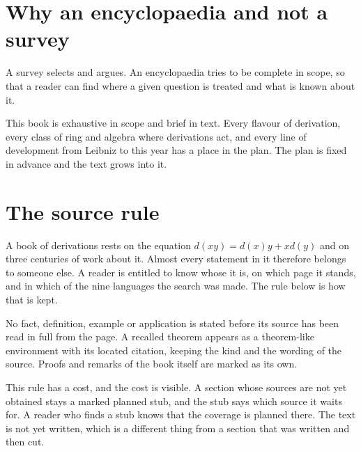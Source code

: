 \section*{Why an encyclopaedia and not a survey}

A survey selects and argues. An encyclopaedia tries to be complete in scope, so that a %
reader can find where a given question is treated and what is known about it.

This book is exhaustive in scope and brief in text. %
Every flavour of derivation, every class of ring and algebra where derivations %
act, and every line of development from Leibniz to this year has a place in the
plan.
The plan is fixed in advance and the text grows into it. %

\section*{The source rule}

A book of derivations rests on the equation $d(xy)=d(x)y+xd(y)$ and on three %
centuries of work about it. Almost every statement in it therefore belongs to someone else. %
A reader is entitled to know whose it is, on which page it stands, and in which
of the nine languages the search was made. The rule below is how that is kept. %

No fact, definition, example or application is stated before its source has been %
read in full from the page.
A recalled theorem appears as a theorem-like environment with its located %
citation, keeping the kind and the wording of the source.
Proofs and remarks of the book itself are marked as its own. %

This rule has a cost, and the cost is visible. %
A section whose sources are not yet obtained stays a marked planned %
stub, and the stub says which source it waits for.
A reader who finds a stub knows that the coverage is planned there. %
The text is not yet written, which is a different thing from a section that was %
written and then cut.

